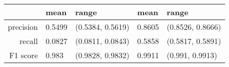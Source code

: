 \begin{table}[ht]
\centering
\begin{tabular}{rllll}
  \hline
 & mean & range & mean & range \\ 
  \hline
precision & 0.5499 & (0.5384, 0.5619) & 0.8605 & (0.8526, 0.8666) \\ 
  recall & 0.0827 & (0.0811, 0.0843) & 0.5858 & (0.5817, 0.5891) \\ 
  F1 score & 0.983 & (0.9828, 0.9832) & 0.9911 & (0.991, 0.9913) \\ 
   \hline
\end{tabular}
\end{table}
